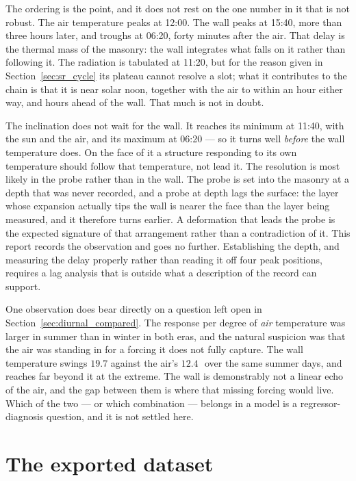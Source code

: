 \documentclass[11pt,a4paper]{article}
\begin{document}
The ordering is the point, and it does not rest on the one number in it that is not robust. The air temperature peaks at 12:00. The wall peaks at 15:40, more than three hours later, and troughs at 06:20, forty minutes after the air. That delay is the thermal mass of the masonry: the wall integrates what falls on it rather than following it. The radiation is tabulated at 11:20, but for the reason given in Section~\ref{sec:sr_cycle} its plateau cannot resolve a slot; what it contributes to the chain is that it is near solar noon, together with the air to within an hour either way, and hours ahead of the wall. That much is not in doubt.

The inclination does not wait for the wall. It reaches its minimum at 11:40, with the sun and the air, and its maximum at 06:20 --- so it turns well \emph{before} the wall temperature does. On the face of it a structure responding to its own temperature should follow that temperature, not lead it. The resolution is most likely in the probe rather than in the wall. The probe is set into the masonry at a depth that was never recorded, and a probe at depth lags the surface: the layer whose expansion actually tips the wall is nearer the face than the layer being measured, and it therefore turns earlier. A deformation that leads the probe is the expected signature of that arrangement rather than a contradiction of it. This report records the observation and goes no further. Establishing the depth, and measuring the delay properly rather than reading it off four peak positions, requires a lag analysis that is outside what a description of the record can support.

One observation does bear directly on a question left open in Section~\ref{sec:diurnal_compared}. The response per degree of \emph{air} temperature was larger in summer than in winter in both eras, and the natural suspicion was that the air was standing in for a forcing it does not fully capture. The wall temperature swings $19.7$ against the air's $12.4$\,\degC\ over the same summer days, and reaches far beyond it at the extreme. The wall is demonstrably not a linear echo of the air, and the gap between them is where that missing forcing would live. Which of the two --- or which combination --- belongs in a model is a regressor-diagnosis question, and it is not settled here.

\section{The exported dataset}
\label{sec:dataset}
\end{document}
